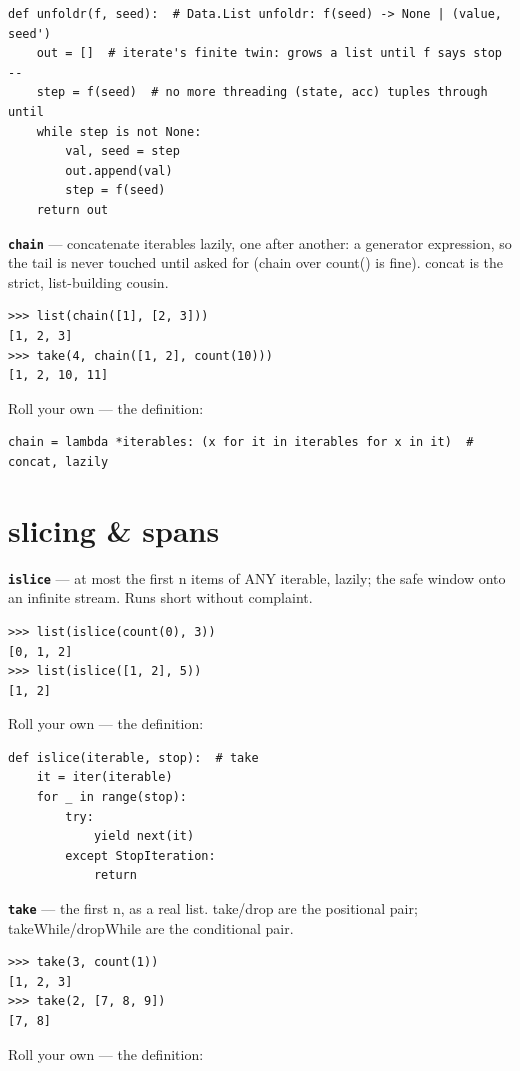 \documentclass[10pt,letterpaper]{article}
\begin{document}
\begin{lstlisting}[style=ex]
def unfoldr(f, seed):  # Data.List unfoldr: f(seed) -> None | (value, seed')
    out = []  # iterate's finite twin: grows a list until f says stop --
    step = f(seed)  # no more threading (state, acc) tuples through until
    while step is not None:
        val, seed = step
        out.append(val)
        step = f(seed)
    return out
\end{lstlisting}
\textbf{\texttt{chain}} --- concatenate iterables lazily, one after another: a generator expression, so the tail is never touched until asked for (chain over count() is fine). concat is the strict, list-building cousin.
\begin{lstlisting}[style=ex]
>>> list(chain([1], [2, 3]))
[1, 2, 3]
>>> take(4, chain([1, 2], count(10)))
[1, 2, 10, 11]
\end{lstlisting}

Roll your own --- the definition:

\begin{lstlisting}[style=ex]
chain = lambda *iterables: (x for it in iterables for x in it)  # concat, lazily
\end{lstlisting}

\section{slicing \& spans}
\textbf{\texttt{islice}} --- at most the first n items of ANY iterable, lazily; the safe window onto an infinite stream. Runs short without complaint.
\begin{lstlisting}[style=ex]
>>> list(islice(count(0), 3))
[0, 1, 2]
>>> list(islice([1, 2], 5))
[1, 2]
\end{lstlisting}

Roll your own --- the definition:

\begin{lstlisting}[style=ex]
def islice(iterable, stop):  # take
    it = iter(iterable)
    for _ in range(stop):
        try:
            yield next(it)
        except StopIteration:
            return
\end{lstlisting}
\textbf{\texttt{take}} --- the first n, as a real list. take/drop are the positional pair; takeWhile/dropWhile are the conditional pair.
\begin{lstlisting}[style=ex]
>>> take(3, count(1))
[1, 2, 3]
>>> take(2, [7, 8, 9])
[7, 8]
\end{lstlisting}

Roll your own --- the definition:
\end{document}

